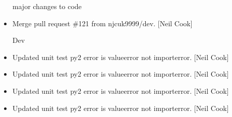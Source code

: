 \documentclass[a4paper,10pt,english]{report}
\begin{document}
\begin{itemize}
major changes to code

\item {} 
Merge pull request \#121 from njcuk9999/dev. {[}Neil Cook{]}

Dev

\item {} 
Updated unit test \sphinxhyphen{} py2 error is valueerror not importerror. {[}Neil
Cook{]}

\item {} 
Updated unit test \sphinxhyphen{} py2 error is valueerror not importerror. {[}Neil
Cook{]}

\item {} 
Updated unit test \sphinxhyphen{} py2 error is valueerror not importerror. {[}Neil
Cook{]}

\item {} 
Updated unit test \sphinxhyphen{} py2 error is valueerror not importerror. {[}Neil
Cook{]}

\end{itemize}
\end{document}
